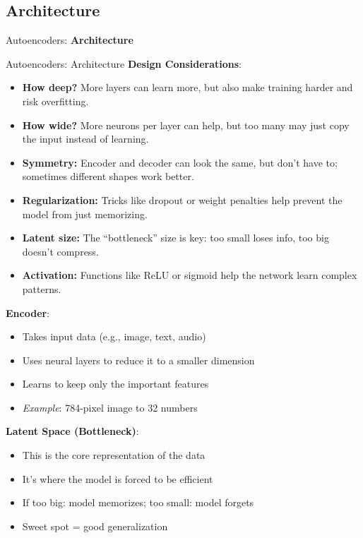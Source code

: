 \subsection{Architecture}
\begin{frame}{}
    \LARGE Autoencoders: \textbf{Architecture}
\end{frame}

\begin{frame}[allowframebreaks]{Autoencoders: Architecture}
\textbf{Design Considerations}:
\small
\begin{itemize}
    \item \textbf{How deep?} More layers can learn more, but also make training harder and risk overfitting.
    \item \textbf{How wide?} More neurons per layer can help, but too many may just copy the input instead of learning.
    \item \textbf{Symmetry:} Encoder and decoder can look the same, but don’t have to; sometimes different shapes work better.
    \item \textbf{Regularization:} Tricks like dropout or weight penalties help prevent the model from just memorizing.
    \item \textbf{Latent size:} The “bottleneck” size is key: too small loses info, too big doesn’t compress.
    \item \textbf{Activation:} Functions like ReLU or sigmoid help the network learn complex patterns.
\end{itemize}
\normalsize

\framebreak

\textbf{Encoder}:
\begin{itemize}
    \item Takes input data (e.g., image, text, audio)
    \item Uses neural layers to reduce it to a smaller dimension
    \item Learns to keep only the important features
    \item \textit{Example}: 784-pixel image to 32 numbers
\end{itemize}

\framebreak
\textbf{Latent Space (Bottleneck)}:
\begin{itemize}
    \item This is the core representation of the data
    \item It's where the model is forced to be efficient
    \item If too big: model memorizes; too small: model forgets
    \item Sweet spot = good generalization
\end{itemize}


\end{frame}
